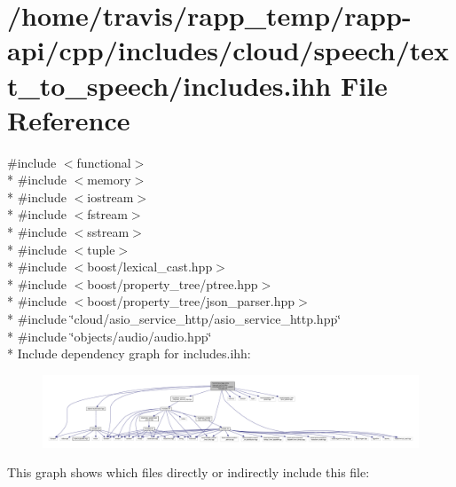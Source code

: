 \hypertarget{cloud_2speech_2text__to__speech_2includes_8ihh}{\section{/home/travis/rapp\-\_\-temp/rapp-\/api/cpp/includes/cloud/speech/text\-\_\-to\-\_\-speech/includes.ihh File Reference}
\label{cloud_2speech_2text__to__speech_2includes_8ihh}
}
{\ttfamily \#include $<$functional$>$}\\*
{\ttfamily \#include $<$memory$>$}\\*
{\ttfamily \#include $<$iostream$>$}\\*
{\ttfamily \#include $<$fstream$>$}\\*
{\ttfamily \#include $<$sstream$>$}\\*
{\ttfamily \#include $<$tuple$>$}\\*
{\ttfamily \#include $<$boost/lexical\-\_\-cast.\-hpp$>$}\\*
{\ttfamily \#include $<$boost/property\-\_\-tree/ptree.\-hpp$>$}\\*
{\ttfamily \#include $<$boost/property\-\_\-tree/json\-\_\-parser.\-hpp$>$}\\*
{\ttfamily \#include \char`\"{}cloud/asio\-\_\-service\-\_\-http/asio\-\_\-service\-\_\-http.\-hpp\char`\"{}}\\*
{\ttfamily \#include \char`\"{}objects/audio/audio.\-hpp\char`\"{}}\\*
Include dependency graph for includes.\-ihh\-:
\nopagebreak
\begin{figure}[H]
\begin{center}
\leavevmode
\includegraphics[width=350pt]{cloud_2speech_2text__to__speech_2includes_8ihh__incl}
\end{center}
\end{figure}
This graph shows which files directly or indirectly include this file\-:
\nopagebreak
